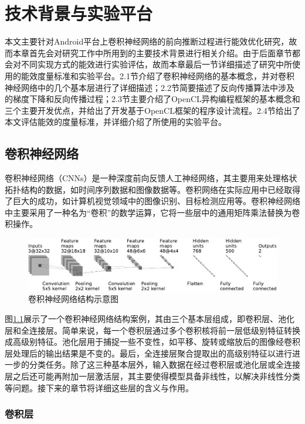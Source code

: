 \chapter{技术背景与实验平台}
本文主要针对Android平台上卷积神经网络的前向推断过程进行能效优化研究，故而本章首先会对研究工作中所用到的主要技术背景进行相关介绍。由于后面章节都会对不同实现方式的能效进行实验评估，故而本章最后一节详细描述了研究中所使用的能效度量标准和实验平台。2.1节介绍了卷积神经网络的基本概念，并对卷积神经网络中的几个基本层进行了详细描述；2.2节简要描述了反向传播算法中涉及的梯度下降\cite{bottou2010large}和反向传播过程；2.3节主要介绍了OpenCL异构编程框架的基本概念和三个主要开发优点，并给出了开发基于OpenCL框架的程序设计流程。2.4节给出了本文评估能效的度量标准，并详细介绍了所使用的实验平台。

\section{卷积神经网络}
卷积神经网络（CNNs）是一种深度前向反馈人工神经网络\cite{schalkoff1997artificial}，其主要用来处理格状拓扑结构的数据，如时间序列数据和图像数据等。卷积网络在实际应用中已经取得了巨大的成功，如计算机视觉领域中的图像识别、目标检测应用等。卷积神经网络中主要采用了一种名为“卷积”的数学运算，它将一些层中的通用矩阵乘法替换为卷积操作。

\begin{figure}[htbp]
    \includegraphics[width=1\textwidth]{figures/convnet_fig_cropped.pdf}
    \caption{卷积神经网络结构示意图 \cite{github.com}}\label{figure:figure1}
\end{figure}

图\ref{figure:figure1}展示了一个卷积神经网络结构案例，其由三个基本层组成，即卷积层、池化层和全连接层。简单来说，每一个卷积层通过多个卷积核将前一层低级别特征转换成高级别特征。池化层用于捕捉一些不变性，如平移、旋转或缩放后的图像经卷积层处理后的输出结果是不变的。最后，全连接层聚合提取出的高级别特征以进行进一步的分类任务。除了这三种基本层外，输入数据在经过卷积层或池化层或全连接层之后还可能再附加一层激活层，其主要使得模型具备非线性，以解决非线性分类等问题。接下来的章节将详细这些层的含义与作用。

\subsection{卷积层}
